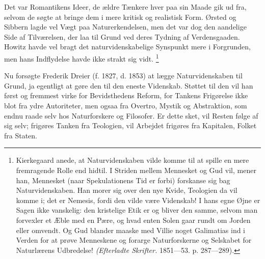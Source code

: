 \documentclass[12pt,a4paper,openany]{book}
\newcommand{\opage}[1]{\marginnote{\footnotesize\textit{[#1]}}}
\begin{document}
Det var Romantikens Ideer, de ældre Tænkere hver paa sin Maade gik ud fra,
selvom de søgte at bringe dem i mere kritisk og realistisk Form. Ørsted og
Sibbern lagde vel Vægt paa Naturerkendelsen, men det var dog den aandelige Side
af Tilværelsen, der laa til Grund ved deres Tydning af Verdensgaaden. Howitz
havde vel bragt det naturvidenskabelige Synspunkt mere i Forgrunden, men hans
Indflydelse havde ikke strakt sig vidt.%
\footnote[1]{Kierkegaard anede, at Naturvidenskaben vilde komme til at spille
en mere fremragende Rolle end hidtil. I Striden mellem Mennesket og Gud vil,
mener han, Mennesket (naar Spekulationens Tid er forbi) forskanse sig bag
Naturvidenskaben. Han morer sig over den nye Kvide, Teologien da vil komme i;
det er Nemesis, fordi den vilde være Videnskab! I hans egne Øjne er Sagen ikke
vanskelig: den kristelige Etik er og bliver den samme, selvom man forvexler et
Æble med en Pære, og hvad enten Solen gaar rundt om Jorden eller omvendt. Og
Gud blander maaske med Villie noget Galimatias ind i Verden for at prøve
Menneskene og forarge Naturforskerne og Selskabet for Naturlærens Udbredelse!
\textit{(Efterladte Skrifter.} 1851---53. p. 287---289).}

Nu forsøgte Frederik Dreier (f. 1827, d. 1853) at lægge Naturvidenskaben til
Grund, ja egentligt at gøre den til den
\setcounter{footnote}{0}%
\opage{176}eneste Videnskab. Støttet til den vil han først og fremmest virke
for Bevidsthedens Reform, for Tankens Frigørelse ikke blot fra ydre
Autoriteter, men ogsaa fra Overtro, Mystik og Abstraktion, som endnu raade selv
hos Naturforskere og Filosofer. Er dette sket, vil Resten følge af sig selv;
frigøres Tanken fra Teologien, vil Arbejdet frigøres fra Kapitalen, Folket fra
Staten.
\end{document}
